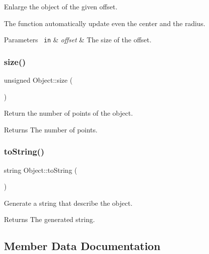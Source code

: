 Enlarge the object of the given offset. 

The function automatically update even the center and the radius.


\begin{DoxyParams}[1]{Parameters}
\mbox{\texttt{ in}}  & {\em offset} & The size of the offset. \\
\hline
\end{DoxyParams}
\mbox{\label{class_object_aa3744105f4a391f66ffb522df079b3c9}} 
\subsubsection{\texorpdfstring{size()}{size()}}
{\footnotesize\ttfamily unsigned Object\+::size (\begin{DoxyParamCaption}{ }\end{DoxyParamCaption})}



Return the number of points of the object. 

\begin{DoxyReturn}{Returns}
The number of points. 
\end{DoxyReturn}
\mbox{\label{class_object_acf6d17366700fe12cafd6269561fad69}} 
\subsubsection{\texorpdfstring{toString()}{toString()}}
{\footnotesize\ttfamily string Object\+::to\+String (\begin{DoxyParamCaption}{ }\end{DoxyParamCaption})}



Generate a string that describe the object. 

\begin{DoxyReturn}{Returns}
The generated string. 
\end{DoxyReturn}


\subsection{Member Data Documentation}
\mbox{\label{class_object_a73b61b5048f06c8d79d1cbab64d953a0}} 
